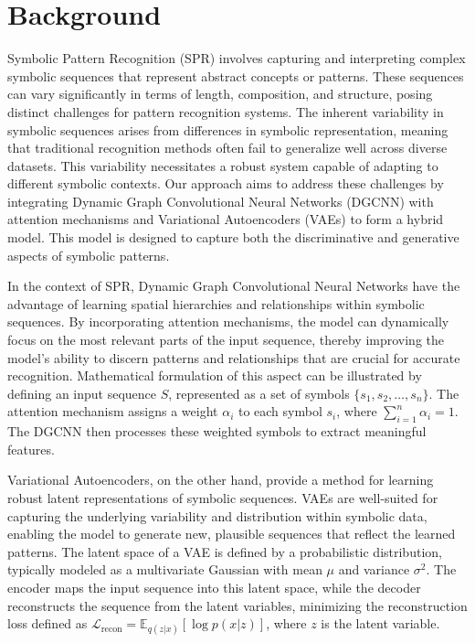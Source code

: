 \documentclass{article}
\begin{document}
\section{Background}
Symbolic Pattern Recognition (SPR) involves capturing and interpreting complex symbolic sequences that represent abstract concepts or patterns. These sequences can vary significantly in terms of length, composition, and structure, posing distinct challenges for pattern recognition systems. The inherent variability in symbolic sequences arises from differences in symbolic representation, meaning that traditional recognition methods often fail to generalize well across diverse datasets. This variability necessitates a robust system capable of adapting to different symbolic contexts. Our approach aims to address these challenges by integrating Dynamic Graph Convolutional Neural Networks (DGCNN) with attention mechanisms and Variational Autoencoders (VAEs) to form a hybrid model. This model is designed to capture both the discriminative and generative aspects of symbolic patterns.

In the context of SPR, Dynamic Graph Convolutional Neural Networks have the advantage of learning spatial hierarchies and relationships within symbolic sequences. By incorporating attention mechanisms, the model can dynamically focus on the most relevant parts of the input sequence, thereby improving the model's ability to discern patterns and relationships that are crucial for accurate recognition. Mathematical formulation of this aspect can be illustrated by defining an input sequence \( S \), represented as a set of symbols \( \{s_1, s_2, \ldots, s_n\} \). The attention mechanism assigns a weight \( \alpha_i \) to each symbol \( s_i \), where \(\sum_{i=1}^{n} \alpha_i = 1\). The DGCNN then processes these weighted symbols to extract meaningful features.

Variational Autoencoders, on the other hand, provide a method for learning robust latent representations of symbolic sequences. VAEs are well-suited for capturing the underlying variability and distribution within symbolic data, enabling the model to generate new, plausible sequences that reflect the learned patterns. The latent space of a VAE is defined by a probabilistic distribution, typically modeled as a multivariate Gaussian with mean \( \mu \) and variance \( \sigma^2 \). The encoder maps the input sequence into this latent space, while the decoder reconstructs the sequence from the latent variables, minimizing the reconstruction loss defined as \( \mathcal{L}_{\text{recon}} = \mathbb{E}_{q(z|x)}[\log p(x|z)] \), where \( z \) is the latent variable.
\end{document}
